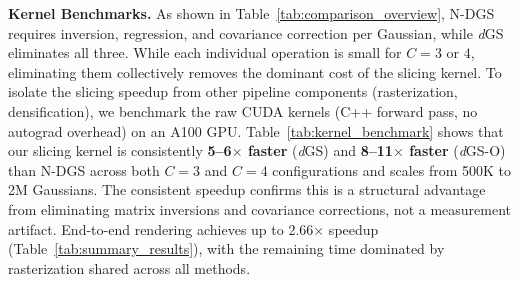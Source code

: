\documentclass{article}
\newcommand{\modelname}{\textit{d}GS}
\theoremstyle{plain}
\theoremstyle{definition}
\theoremstyle{remark}
\begin{document}
\textbf{Kernel Benchmarks.} As shown in Table~\ref{tab:comparison_overview}, N-DGS requires inversion, regression, and covariance correction per Gaussian, while \modelname{} eliminates all three. While each individual operation is small for $C{=}3$ or $4$, eliminating them collectively removes the dominant cost of the slicing kernel. To isolate the slicing speedup from other pipeline components (rasterization, densification), we benchmark the raw CUDA kernels (C++ forward pass, no autograd overhead) on an A100 GPU. Table~\ref{tab:kernel_benchmark} shows that our slicing kernel is consistently \textbf{5--6$\times$ faster} (\textit{d}GS) and \textbf{8--11$\times$ faster} (\textit{d}GS-O) than N-DGS across both $C{=}3$ and $C{=}4$ configurations and scales from 500K to 2M Gaussians. The consistent speedup confirms this is a structural advantage from eliminating matrix inversions and covariance corrections, not a measurement artifact. End-to-end rendering achieves up to 2.66$\times$ speedup (Table~\ref{tab:summary_results}), with the remaining time dominated by rasterization shared across all methods.

\begin{table}[t]
\centering
\caption{CUDA kernel benchmark: slicing-only forward pass time (ms) on A100. Both N-DGS and \modelname{} use the same C++ entry point with identical inputs, isolating the slicing computation.}
\label{tab:kernel_benchmark}
\setlength{\tabcolsep}{4pt}
\vspace{-1em}
\end{table}
\end{document}

